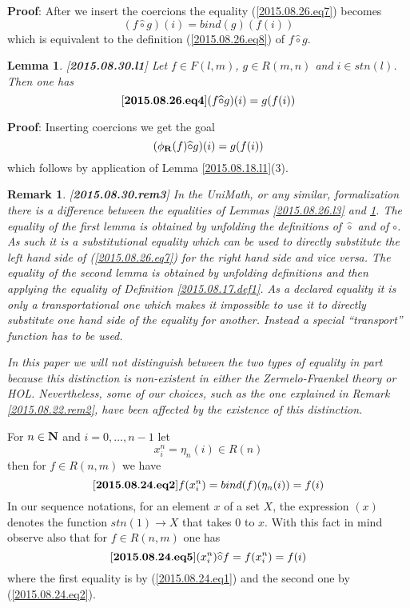 \documentclass[11pt]{article}
\newenvironment{eq}{\begin{equation}}{\end{equation}}
\newenvironment{proof}{{\bf Proof}:}{\vskip 5mm }
\newtheorem{lemma}[proposition]{Lemma}
\newtheorem{remark}[proposition]{Remark}
\newcommand{\llabel}[1]{\label{#1}[{\bf #1}]}
\newcommand{\sr}{\rightarrow}
\newcommand{\nn}{{\bf N\rm}}
\newcommand{\nat}{\nn}
\newcommand{\rr}{{\bf R}}
\newcommand{\wh}{\widehat}
\newcommand{\bind}{bind}
\newcommand{\hc}{\wh{\circ}}
\begin{document}
%
\begin{proof}
After we insert the coercions the equality (\ref{2015.08.26.eq7}) becomes
%
$$(f\hc g)(i)=\bind(g)(f(i))$$
%
which is equivalent to the definition (\ref{2015.08.26.eq8}) of $f\hc g$.
\end{proof}
% 
\begin{lemma}
\llabel{2015.08.30.l1}
Let $f\in F(l,m)$, $g\in R(m,n)$ and $i\in stn(l)$. Then one has
%
\begin{eq}\llabel{2015.08.26.eq4}
(f\hc g)(i)=g(f(i))
\end{eq}
% 
\end{lemma}
%
\begin{proof}
Inserting coercions we get the goal
%
$$(\phi_{\rr}(f)\hc g)(i)=g(f(i))$$
%
which follows by application of Lemma \ref{2015.08.18.l1}(3).
\end{proof}
%
\begin{remark}\rm
\llabel{2015.08.30.rem3}
In the UniMath, or any similar, formalization there is a difference between the equalities of Lemmas \ref{2015.08.26.l3} and \ref{2015.08.30.l1}. The equality of the first lemma is obtained by unfolding the definitions of $\hc$ and of $\circ$. As such it is a substitutional equality which can be used to directly substitute the left hand side of (\ref{2015.08.26.eq7}) for the right hand side and vice versa. The equality of the second lemma is obtained by unfolding definitions and then applying the equality of Definition \ref{2015.08.17.def1}. As a declared equality it is only a transportational one which makes it impossible to use it to directly substitute one hand side of the equality for another. Instead a special ``transport'' function has to be used. 

In this paper we will not distinguish between the two types of equality in part because this distinction is non-existent in either the Zermelo-Fraenkel theory or HOL. Nevertheless, some of our choices, such as the one explained in Remark \ref{2015.08.22.rem2}, have been affected by the existence of this distinction. 
\end{remark}
%



For $n\in\nat$ and $i=0,\dots,n-1$ let
%
$$x_i^n=\eta_n(i)\in R(n)$$
%
then for $f\in R(n,m)$ we have
%
\begin{eq}\llabel{2015.08.24.eq2}
f(x_i^n)=\bind(f)(\eta_n(i))=f(i)
\end{eq}
%
In our sequence notations, for an element $x$ of a set $X$, the expression $(x)$ denotes the function $stn(1)\sr X$ that takes $0$ to $x$. With this fact in mind observe also that for $f\in R(n,m)$ one has
%
\begin{eq}\llabel{2015.08.24.eq5}
(x_i^n)\hc f=f(x_i^n)=f(i)
\end{eq}
%
where the first equality is by  (\ref{2015.08.24.eq1}) and the second one by (\ref{2015.08.24.eq2}). 
\end{document}
